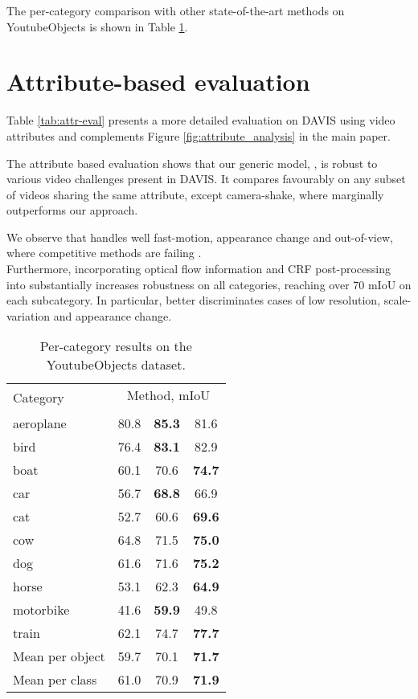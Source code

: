 \documentclass[10pt,twocolumn,letterpaper]{article}
\makeatletter
\renewcommand{\paragraph}{\@startsection{paragraph}{4}{\z@}{0.5ex \@plus 1ex \@minus .2ex}{-0.5em}{\normalfont \normalsize \bfseries}}
\makeatother
\begin{document}
\paragraph{YoutubeObjects}
The per-category comparison with other state-of-the-art methods on YoutubeObjects is shown in Table \ref{tab:youtube_cat}.



\section{Attribute-based evaluation}
\label{sec:attr_eval}

Table \ref{tab:attr-eval} presents a more detailed evaluation on DAVIS using video attributes and complements Figure \ref{fig:attribute_analysis} in the main paper.

The attribute based evaluation shows that our generic model, ,
is robust to various video challenges present in DAVIS. It compares favourably on any subset of videos sharing the same attribute, except camera-shake, where  \cite{Tsai2016Cvpr} marginally outperforms our approach.

We observe that  handles well fast-motion, appearance change and out-of-view, where competitive methods are failing \cite{Maerki2016Cvpr, Tsai2016Cvpr}.\\
Furthermore, incorporating optical flow information and CRF post-processing into  substantially increases robustness on all categories, reaching over 70 mIoU on each subcategory.
In particular, 
better discriminates cases of low resolution, scale-variation and appearance change.

\begin{table}
\begin{centering}
\begingroup
\begin{tabular}{l@{   }|@{   }c@{   }c@{   }c@{   }}
\multirow{2}{*}{Category} & \multicolumn{3}{c}{Method, mIoU}\\
&  \cite{Maerki2016Cvpr} &  \cite{Tsai2016Cvpr}&  \tabularnewline
\hline
\hline
aeroplane& 80.8& \textbf{85.3} & 81.6\tabularnewline
bird & 76.4 & \textbf{83.1}& 82.9 \tabularnewline
boat& 60.1 & 70.6 & \textbf{74.7} \tabularnewline
car& 56.7 & \textbf{68.8} & 66.9 \tabularnewline
cat& 52.7 & 60.6 & \textbf{69.6}\tabularnewline
cow& 64.8& 71.5 & \textbf{75.0} \tabularnewline
dog& 61.6 & 71.6 & \textbf{75.2} \tabularnewline
horse& 53.1 & 62.3 & \textbf{64.9} \tabularnewline
motorbike& 41.6 & \textbf{59.9} & 49.8 \tabularnewline
train& 62.1& 74.7 & \textbf{77.7} \tabularnewline
\hline
Mean per object& 59.7 & 70.1 & \textbf{71.7} \tabularnewline
Mean per class& 61.0 & 70.9 & \textbf{71.9} \tabularnewline
\end{tabular}\endgroup
\par\end{centering}
\caption{\label{tab:youtube_cat}Per-category results on the YoutubeObjects dataset.}
\end{table}
\end{document}
